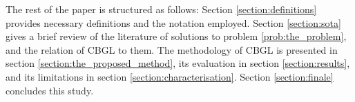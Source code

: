 \lipsum[0-2]

The rest of the paper is structured as follows: Section
\ref{section:definitions} provides necessary definitions and the notation
employed. Section \ref{section:sota} gives a brief review of the
literature of solutions to problem \ref{prob:the_problem}, and the relation of
CBGL to them.  The methodology of CBGL is presented in section
\ref{section:the_proposed_method}, its evaluation in section
\ref{section:results}, and its limitations in section
\ref{section:characterisation}. Section \ref{section:finale} concludes this
study.
